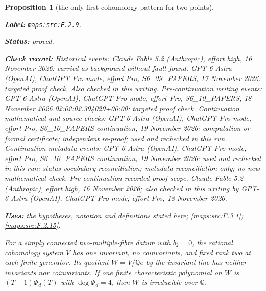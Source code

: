 \documentclass[11pt,a4paper]{article}
\newtheorem{proposition}[proposition]{Proposition}
\theoremstyle{definition}
\newcommand{\StatementRecord}[4]{\par\smallskip\begingroup\upshape\raggedright\noindent\textbf{Label:} \nolinkurl{#1}.\par\noindent\textbf{Status:} #2.\par\noindent\textbf{Check record:} #3.\par\noindent\textbf{Uses:} #4.\par\endgroup\smallskip}
\begin{document}
\begin{proposition}[the only first-cohomology pattern for two points]\label{maps:src:F.2.9}
\StatementRecord{maps:src:F.2.9}{proved}{Historical events: Claude Fable 5.2 (Anthropic), effort high, 16 November 2026: carried as background without fault found. GPT-6 Astra (OpenAI), ChatGPT Pro mode, effort Pro, S6\_09\_PAPERS, 17 November 2026: targeted proof check. Also checked in this writing. Pre-continuation writing events: GPT-6 Astra (OpenAI), ChatGPT Pro mode, effort Pro, S6\_10\_PAPERS, 18 November 2026 02:02:02.394029+00:00: targeted proof check. Continuation mathematical and source checks: GPT-6 Astra (OpenAI), ChatGPT Pro mode, effort Pro, S6\_10\_PAPERS continuation, 19 November 2026: computation or formal certificate; independent re-proof; used and rechecked in this run. Continuation metadata events: GPT-6 Astra (OpenAI), ChatGPT Pro mode, effort Pro, S6\_10\_PAPERS continuation, 19 November 2026: used and rechecked in this run; status-vocabulary reconciliation; metadata reconciliation only; no new mathematical check. \emph{Pre-continuation recorded proof scope.} Claude Fable 5.2 (Anthropic), effort high, 16 November 2026; also checked in this writing by GPT-6 Astra (OpenAI), ChatGPT Pro mode, effort Pro, 18 November 2026}{the hypotheses, notation and definitions stated here; \cref{maps:src:F.3.1}; \cref{maps:src:F.2.15}}


For a simply connected two-multiple-fibre datum with $b_2=0$,
the rational
cohomology system $V$ has one invariant, no coinvariants,
and fixed rank two at each finite generator.  Its quotient
$W=V/\mathbb Qe$ by the invariant line has neither invariants
nor coinvariants.  If one finite characteristic polynomial
on $W$ is $(T-1)\Phi_d(T)$ with $\deg\Phi_d=4$, then $W$
is irreducible over $\mathbb Q$.

\end{proposition}
\end{document}
